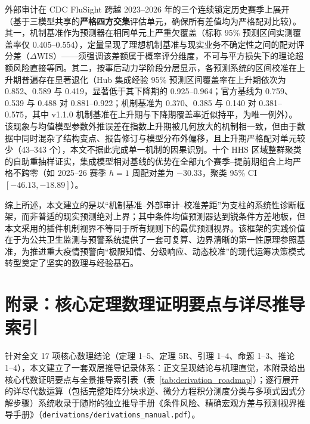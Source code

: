 \documentclass[11pt,a4paper]{article}
\theoremstyle{plain}
\theoremstyle{definition}
\begin{document}
外部审计在 CDC FluSight 跨越 2023--2026 年的三个连续锁定历史赛季上展开（基于三模型共享的\textbf{严格四方交集}评估单元，确保所有差值均为严格配对比较）。其一，机制基准作为预测器在相同单元上严重欠覆盖（标称 95\% 预测区间实测覆盖率仅 0.405--0.554），定量呈现了理想机制基准与现实业务不确定性之间的配对评分差（$\Delta\mathrm{WIS}$）——须强调该差额属于概率评分维度，不可与平方损失下的理论超额风险直接等同。其二，按事后动力学阶段分层显示，各预测系统的区间校准在上升期普遍存在显著退化（Hub 集成经验 95\% 预测区间覆盖率在上升期依次为 0.852、0.589 与 0.419，显著低于其下降期的 0.925--0.964；官方基线为 0.759、0.539 与 0.488 对 0.881--0.922；机制基准为 0.370、0.385 与 0.140 对 0.381--0.575，其中 v1.1.0 机制基准在上升期与下降期覆盖率近似持平，为唯一例外）。该现象与均值模型参数外推误差在指数上升期被几何放大的机制相一致，但由于数据中同时混杂了结构变点、报告修订与模型分布外偏移，且上升期严格配对单元较少（43--343 个），本文不据此完成单一机制的因果识别。十个 HHS 区域整群聚类的自助重抽样证实，集成模型相对基线的优势在全部九个赛季--提前期组合上均严格不跨零（如 2025--26 赛季 $h=1$ 周配对差为 $-30.33$，聚类 95\% CI $[-46.13, -18.89]$）。

综上所述，本文建立的是以“机制基准--外部审计--校准差距”为支柱的系统性诊断框架，而非普适的现实预测绝对上界；其中条件均值预测器达到锐条件方差地板，但本文采用的插件机制视界不等同于所有规则下的最优预测视界。该框架的实践价值在于为公共卫生监测与预警系统提供了一套可复算、边界清晰的第一性原理参照基准，为推进重大疫情预警向“极限知情、分级响应、动态校准”的现代运筹决策模式转型奠定了坚实的数理与经验基石。

\clearpage
\appendix
\section*{附录：核心定理数理证明要点与详尽推导索引}

针对全文 17 项核心数理结论（定理 1--5、定理 5R、引理 1--4、命题 1--3、推论 1--4），本文建立了一套双层推导记录体系：正文呈现结论与机理直觉，本附录给出核心代数证明要点与全景推导索引表（表~\ref{tab:derivation_roadmap}）；逐行展开的详尽代数运算（包括完整矩阵分块求逆、微分方程积分测度分类与多项式因式分解步骤）系统收录于随附的独立推导手册《条件风险、精确宏观方差与预测视界推导手册》（\texttt{derivations/derivations\_manual.pdf}）。
\end{document}
